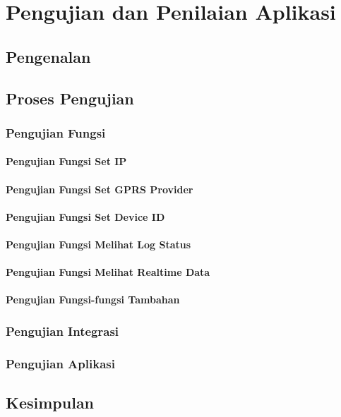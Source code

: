 \chapter{Pengujian dan Penilaian Aplikasi}\label{c6}

\section{Pengenalan}

\section{Proses Pengujian}

\subsection{Pengujian Fungsi}

\subsubsection{Pengujian Fungsi Set IP}

\subsubsection{Pengujian Fungsi Set GPRS Provider}

\subsubsection{Pengujian Fungsi Set Device ID}

\subsubsection{Pengujian Fungsi Melihat Log Status}

\subsubsection{Pengujian Fungsi Melihat Realtime Data}

\subsubsection{Pengujian Fungsi-fungsi Tambahan}

\subsection{Pengujian Integrasi}

\subsection{Pengujian Aplikasi}

\section{Kesimpulan}
